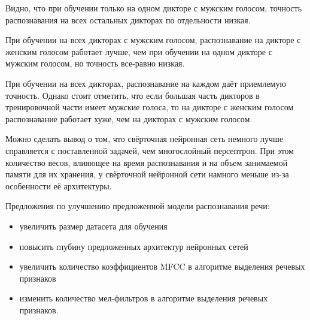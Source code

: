 Видно, что при обучении только на одном дикторе с мужским голосом, точность распознавания на всех остальных дикторах по отдельности низкая. 

При обучении на всех дикторах с мужским голосом, распознавание на дикторе с женским голосом работает лучше, чем при обучении на одном дикторе с мужским голосом, но точность все-равно низкая.

При обучении на всех дикторах, распознавание на каждом даёт приемлемую точность. Однако стоит отметить, что если большая часть дикторов в тренировочной части имеет мужские голоса, то на дикторе с женским голосом распознавание работает хуже, чем на дикторах с мужским голосом.

Можно сделать вывод о том, что свёрточная нейронная сеть немного лучше справляется с поставленной задачей, чем многослойный персептрон. При этом количество весов, влияющее на время распознавания и на объем занимаемой памяти для их хранения, у свёрточной нейронной сети намного меньше из-за особенности её архитектуры.

Предложения по улучшению предложенной модели распознавания речи:
\begin{itemize}[leftmargin=2cm]
	\item увеличить размер датасета для обучения
	\item повысить глубину предложенных архитектур нейронных сетей
	\item увеличить количество коэффициентов MFCC в алгоритме выделения речевых признаков
	\item изменить количество мел-фильтров в алгоритме выделения речевых признаков.
\end{itemize}